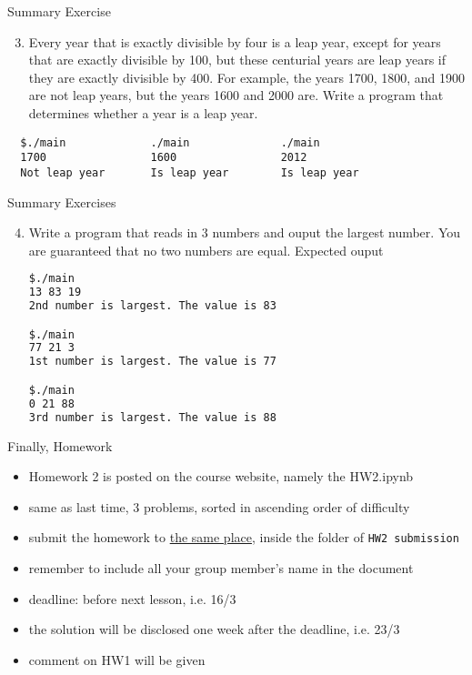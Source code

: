 \documentclass[10pt,xcolor={table,dvipsnames},t]{beamer}
\begin{document}
\begin{frame}[fragile]{Summary Exercise}
  \begin{enumerate}
    \setcounter{enumi}{2}
    \item Every year that is exactly divisible by four is a leap year, except for years that are exactly divisible by 100, but these centurial years are leap years if they are exactly divisible by 400. For example, the years 1700, 1800, and 1900 are not leap years, but the years 1600 and 2000 are. Write a program that determines whether a year is a leap year.
  \end{enumerate}
  \begin{lstlisting}
  $./main             ./main              ./main
  1700                1600                2012
  Not leap year       Is leap year        Is leap year
  \end{lstlisting}
\end{frame}

\begin{frame}[fragile]{Summary Exercises}
  \begin{enumerate}
    \setcounter{enumi}{3}
    \item Write a program that reads in 3 numbers and ouput the largest number. You are guaranteed that no two numbers are equal. Expected ouput
\begin{lstlisting}[language=bash]
$./main
13 83 19
2nd number is largest. The value is 83

$./main
77 21 3
1st number is largest. The value is 77

$./main
0 21 88
3rd number is largest. The value is 88
\end{lstlisting}
  \end{enumerate}
\end{frame}

\begin{frame}[fragile]{Finally, Homework}
  \begin{itemize}
    \item Homework 2 is posted on the course website, namely the HW2.ipynb
    \item same as last time, 3 problems, sorted in ascending order of difficulty
    \item submit the homework to \href{https://drive.google.com/drive/folders/1TqSFSwu8-KdzIHZcQWB7PjgqPJen4dsO?usp=sharing}{the same place}, inside the folder of \texttt{HW2 submission}
    \item remember to include all your group member's name in the document
    \item deadline: before next lesson, i.e. 16/3
    \item the solution will be disclosed one week after the deadline, i.e. 23/3
    \item comment on HW1 will be given
  \end{itemize}
\end{frame}
\end{document}
